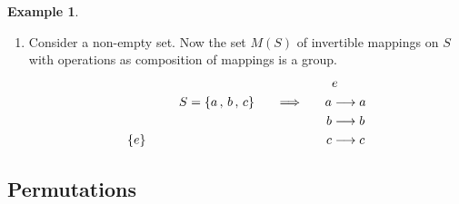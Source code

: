 \documentclass[11pt,a4paper]{article}
\theoremstyle{definition}
\newtheorem{exa}[thm]{Example}
\begin{document}
\begin{exa}
\begin{enumerate}
\begin{align*}
\begin{pmatrix}
b_1c_1 + b_2c_3 & b_1c_2 + b_4c_3\\
b_3c_1 + b_4c_3 & b_2c_2 + b_4c_4\\
\end{pmatrix}\\\\
& = \begin{pmatrix}
a_1 & a_2\\
a_3 & a_4\\
\end{pmatrix}
\begin{bmatrix}
\begin{pmatrix}
b_1 & b_2\\
b_3 & b_4\\
\end{pmatrix}\begin{pmatrix}
c_1 & c_2\\
c_3 & c_4\\
\end{pmatrix}
\end{bmatrix} = A(BC)\\
\end{align*}



\item Consider a non-empty set. Now the set $M(S)$ of invertible mappings on $S$ with operations as composition of mappings is a group.
\begin{align*}
                                                                  &      e\\
S = \{a\, , \, b\, , \, c\}\hspace{0.5cm}\implies\hspace{0.5cm} a & \longrightarrow a\\
                                                                b & \longrightarrow b\\
   \{e\}      \hspace{5cm}                                      c & \longrightarrow c\\
\end{align*}

\end{enumerate}
\end{exa}











\subsection{Permutations}
\end{document}
